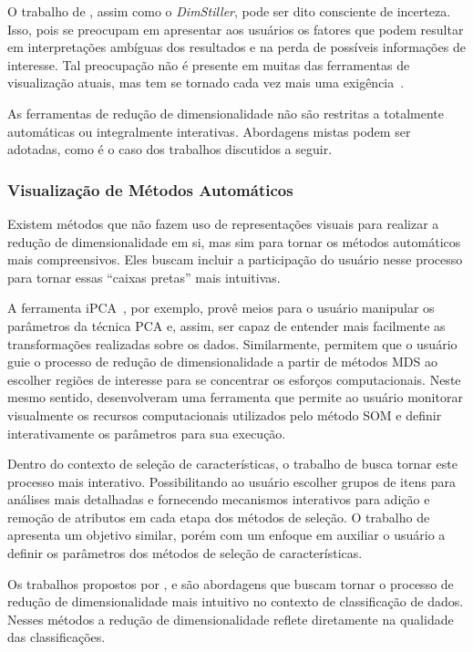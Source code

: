 O trabalho de \citet{Johansson2009}, assim como o
\emph{DimStiller}, pode ser dito consciente de incerteza.
Isso, pois se preocupam em apresentar aos usuários os fatores que
podem resultar em interpretações ambíguas dos resultados e
na perda de possíveis informações de interesse. 
Tal preocupação não é presente em muitas das ferramentas de
visualização atuais, mas tem se tornado cada vez mais uma
exigência~\cite{Dill2012}.

As ferramentas de redução de dimensionalidade não são
restritas a totalmente automáticas ou integralmente
interativas. Abordagens mistas podem ser adotadas, como é o
caso dos trabalhos discutidos a seguir.

\subsubsection{Visualização de Métodos Automáticos}

Existem métodos que não fazem uso de representações
visuais para realizar a redução de dimensionalidade em si,
mas sim para tornar os métodos automáticos mais
compreensivos. Eles buscam incluir a participação do usuário
nesse processo para tornar essas ``caixas pretas'' mais
intuitivas. 

A ferramenta iPCA~\cite{Jeong2009}, por exemplo, provê meios
para o usuário manipular os parâmetros da técnica PCA e,
assim, ser capaz de entender mais facilmente as
transformações realizadas sobre os dados. Similarmente,
\citet{Williams2004} permitem que o usuário guie o processo
de redução de dimensionalidade a partir de métodos MDS ao
escolher regiões de interesse para se concentrar os esforços
computacionais.  Neste mesmo sentido, \citet{Schreck2008}
desenvolveram uma ferramenta que permite ao usuário
monitorar visualmente os recursos computacionais utilizados
pelo método SOM e definir interativamente os parâmetros para
sua execução.

Dentro do contexto de seleção de características, o trabalho
de \citet{Dy2000} busca tornar este processo mais interativo.
Possibilitando ao usuário escolher grupos de itens para
análises mais detalhadas e fornecendo mecanismos interativos
para adição e remoção de atributos em cada etapa dos métodos
de seleção. O trabalho de \citet{Brandoli2010} apresenta um
objetivo similar, porém com um enfoque em auxiliar o
usuário a definir os parâmetros dos métodos de seleção de
características.

Os trabalhos propostos por \citet{Zhang2006}, \citet{Choo2010}
e \citet{Paiva2012} são abordagens que buscam tornar o
processo de redução de dimensionalidade mais intuitivo no
contexto de classificação de dados. Nesses métodos a redução
de dimensionalidade reflete diretamente na qualidade das
classificações. 

